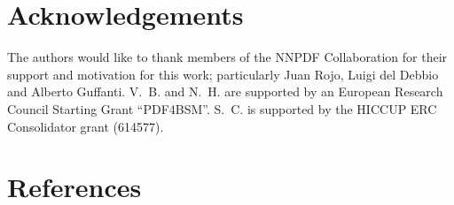 \documentclass[preprint,12pt]{elsarticle}
\begin{document}
\section*{Acknowledgements}

The authors would like to thank members of the NNPDF Collaboration for their support and
motivation for this work; particularly Juan Rojo, Luigi del Debbio and Alberto Guffanti. V.~B. and N.~H. are
supported by an European Research Council Starting Grant ``PDF4BSM''.
S.~C. is supported by the HICCUP ERC Consolidator grant (614577).





\section*{References}








\end{document}
